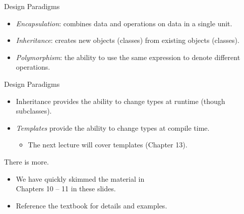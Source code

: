\documentclass[14pt, aspectratio=1610, hyperref={pdfpagelayout=SinglePage}]{beamer}
\begin{document}
\begin{frame}{Design Paradigms}
\begin{itemize}
\item
  \emph{Encapsulation}: combines data and operations on data in a single unit.
\item
  \emph{Inheritance}: creates new objects (classes) from existing objects (classes).
\item
  \emph{Polymorphism}: the ability to use the same expression to denote different operations.
\end{itemize}
\end{frame}

\begin{frame}{Design Paradigms}
\begin{itemize}
\item
  Inheritance provides the ability to change types at runtime (though subclasses).
\item
  \emph{Templates} provide the ability to change types at compile time.
  \begin{itemize}
  \item
    The next lecture will cover templates (Chapter 13).
  \end{itemize}
\end{itemize}
\end{frame}


\begin{frame}{There is more.}
\begin{itemize}
\item
  We have quickly skimmed the material in\\ Chapters 10 -- 11 in these slides.
\item
  Reference the textbook for details and examples.
\end{itemize}
\end{frame}
\end{document}

